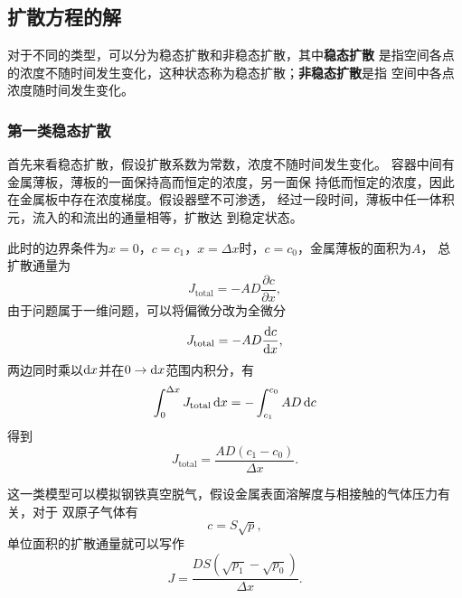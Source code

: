         \subsection{扩散方程的解}
            对于不同的类型，可以分为稳态扩散和非稳态扩散，其中\textbf{稳态扩散}
            是指空间各点的浓度不随时间发生变化，这种状态称为稳态扩散；\textbf{非稳态扩散}是指
            空间中各点浓度随时间发生变化。
            \subsubsection{第一类稳态扩散}
                首先来看稳态扩散，假设扩散系数为常数，浓度不随时间发生变化。
                容器中间有金属薄板，薄板的一面保持高而恒定的浓度，另一面保
                持低而恒定的浓度，因此在金属板中存在浓度梯度。假设器壁不可渗透，
                经过一段时间，薄板中任一体积元，流入的和流出的通量相等，扩散达
                到稳定状态。
                
                此时的边界条件为$x=0$，$c=c_1$，$x=\Delta x$时，$c=c_0$，金属薄板的面积为$A$，
                总扩散通量为
                \begin{equation}
                    J_{\text{total}}=-AD\frac{\partial c}{\partial x},
                \end{equation}
                由于问题属于一维问题，可以将偏微分改为全微分
                \begin{equation}
                    J_{\text{total}}=-AD\frac{\mathop{}\!\mathrm{d} c}{\mathop{}\!\mathrm{d} x},
                \end{equation}
                两边同时乘以$\mathop{}\!\mathrm{d} x$并在$0\to\mathop{}\!\mathrm{d} x$范围内积分，有
                \begin{equation}
                    \int_{0}^{\Delta x}J_{\text{total}}\mathop{}\!\mathrm{d} x=-\int_{c_{1}}^{c_{0}} A D \mathop{}\!\mathrm{d} c
                \end{equation}
                得到
                \begin{equation}
                    J_{\text{total}}=\frac{AD(c_1-c_0)}{\Delta x}.
                \end{equation}

                这一类模型可以模拟钢铁真空脱气，假设金属表面溶解度与相接触的气体压力有关，对于
                双原子气体有
                \begin{equation}
                    c=S\sqrt{p},
                \end{equation}
                单位面积的扩散通量就可以写作
                \begin{equation}
                    J=\frac{D S\left(\sqrt{p_{1}}-\sqrt{p_{0}}\right)}{\Delta x}.
                \end{equation}
